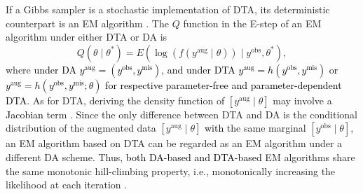 \documentclass[12pt]{article}
\begin{document}
If a Gibbs sampler is a stochastic implementation of DTA, its deterministic counterpart is an EM algorithm \citep{dempster1977maximum}. The $Q$ function in the E-step of an EM algorithm under either DTA or DA is
\begin{equation}\label{qfunc}
Q(\theta\mid \theta^\ast)=E(\log(f(y^{\textrm{aug}}\mid \theta))\mid y^{\textrm{obs}}, \theta^\ast),
\end{equation}
where \textcolor{black}{under DA $y^{\textrm{aug}}=(y^{\textrm{obs}}, y^{\textrm{mis}})$, and under DTA  $y^{\textrm{aug}}=h(y^{\textrm{obs}}, y^{\textrm{mis}})$ or $y^{\textrm{aug}}=h(y^{\textrm{obs}}, y^{\textrm{mis}}; \theta)$  for respective  parameter-free and parameter-dependent DTA}. As for DTA, deriving the density function of $[y^{\textrm{aug}}\mid \theta]$ may involve a \textcolor{black}{Jacobian} term \citep[Equation~2.6,][]{meng1999seeking}. Since the only difference between DTA and DA is  the conditional distribution of the augmented data $[y^{\textrm{aug}}\mid\theta]$ \textcolor{black}{with} the same marginal $[y^{\textrm{obs}}\mid\theta]$,  an EM algorithm based on DTA can be regarded as an EM algorithm under a different DA scheme. Thus, \textcolor{black}{both DA-based and DTA-based} EM algorithms share the same monotonic hill-climbing property, i.e.,  monotonically increasing the likelihood at each iteration \citep[Section~3,][]{dempster1977maximum}. 

\end{document}
